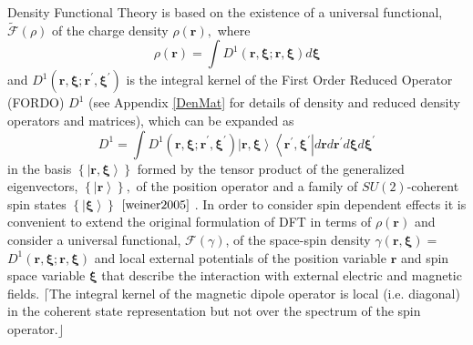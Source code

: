 \documentclass[aps,preprint]{revtex4}%
\begin{document}
\bigskip Density Functional Theory is based on the existence of a universal
functional, $\mathcal{\tilde{F}}\left(  \rho\right)  $ \cite{HK} of the charge
density $\rho\left(  \mathbf{r}\right)  ,$ where
\begin{equation}
\rho\left(  \mathbf{r}\right)  =\int D^{1}\left(  \mathbf{r,\xi;r,\xi}\right)
d\mathbf{\xi}%
\end{equation}
and $D^{1}\left(  \mathbf{r,\xi;r}^{\prime}\mathbf{,\xi}^{\prime}\right)  $ is
the integral kernel of the First Order Reduced Operator (FORDO) $D^{1}$
\cite{Coleman} (see Appendix \ref{DenMat} for details of density and reduced
density operators and matrices), which can be expanded as
\begin{equation}
D^{1}=\int D^{1}\left(  \mathbf{r,\xi;r}^{\prime}\mathbf{,\xi}^{\prime
}\right)  \left\vert \mathbf{r,\xi}\right\rangle \left\langle \mathbf{r}%
^{\prime}\mathbf{,\xi}^{\prime}\right\vert d\mathbf{r}d\mathbf{r}^{\prime
}d\mathbf{\xi}d\mathbf{\xi}^{\prime}%
\end{equation}
in the basis $\left\{  \left\vert \mathbf{r,\xi}\right\rangle \right\}  $
formed by the tensor product of the generalized eigenvectors, $\left\{
\left\vert \mathbf{r}\right\rangle \right\}  ,$ of the position operator and a
family of $SU(2)$-coherent spin states $\left\{  \left\vert \mathbf{\xi
}\right\rangle \right\}  $ $\cite{weiner2005}$ . In order to consider spin
dependent effects it is convenient to extend the original formulation of DFT
in terms of $\rho\left(  \mathbf{r}\right)  $ and consider a universal
functional, $\mathcal{F}\left(  \gamma\right)  $, of the space-spin density
$\gamma\left(  \mathbf{r,\xi}\right)  =$ $D^{1}\left(  \mathbf{r,\xi;r,\xi
}\right)  $ \cite{weiner-trickey} and local external potentials of the
position variable $\mathbf{r}$ and spin space variable $\mathbf{\xi}$ that
describe the interaction with external electric and magnetic fields. $\lceil
$The integral kernel of the magnetic dipole operator is local (i.e. diagonal)
in the coherent state representation but not over the spectrum of the spin
operator$.\rfloor$
\end{document}
